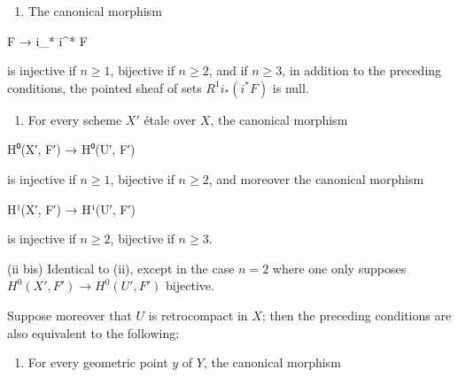 \documentclass[
]{article}
\newenvironment{Shaded}{}{}
\newcommand{\NormalTok}[1]{#1}
\providecommand{\tightlist}{%
  \setlength{\itemsep}{0pt}\setlength{\parskip}{0pt}}
\begin{document}
\begin{enumerate}
\def\labelenumi{(\roman{enumi})}
\tightlist
\item
  The canonical morphism
\end{enumerate}

\begin{Shaded}
\begin{Highlighting}[]
\NormalTok{F → i\_* i\^{}* F}
\end{Highlighting}
\end{Shaded}

is injective if \(n \geqslant 1\), bijective if \(n \geqslant 2\), and
if \(n \geqslant 3\), in addition to the preceding conditions, the
pointed sheaf of sets \(R^{1} i_{*} (i^{*} F)\) is null.

\begin{enumerate}
\def\labelenumi{(\roman{enumi})}
\setcounter{enumi}{1}
\tightlist
\item
  For every scheme \(X'\) étale over \(X\), the canonical morphism
\end{enumerate}

\begin{Shaded}
\begin{Highlighting}[]
\NormalTok{H⁰(X′, F′) → H⁰(U′, F′)}
\end{Highlighting}
\end{Shaded}

is injective if \(n \geqslant 1\), bijective if \(n \geqslant 2\), and
moreover the canonical morphism

\begin{Shaded}
\begin{Highlighting}[]
\NormalTok{H¹(X′, F′) → H¹(U′, F′)}
\end{Highlighting}
\end{Shaded}

is injective if \(n \geqslant 2\), bijective if \(n \geqslant 3\).

(ii bis) Identical to (ii), except in the case \(n = 2\) where one only
supposes \(H^{0}(X', F') \to H^{0}(U', F')\) bijective.

Suppose moreover that \(U\) is retrocompact in \(X\); then the preceding
conditions are also equivalent to the following:

\begin{enumerate}
\def\labelenumi{(\roman{enumi})}
\setcounter{enumi}{2}
\tightlist
\item
  For every geometric point \(y\) of \(Y\), the canonical morphism
\end{enumerate}
\end{document}
